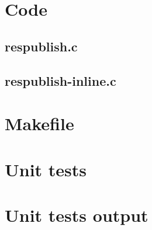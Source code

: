 \section{Code}

\subsection{respublish.c}

\begin{scriptsize}
\begin{ttfamily}

\end{ttfamily}
\end{scriptsize}

\subsection{respublish-inline.c}

\begin{scriptsize}
\begin{ttfamily}

\end{ttfamily}
\end{scriptsize}

\section{Makefile}

\begin{scriptsize}
\begin{ttfamily}

\end{ttfamily}
\end{scriptsize}

\section{Unit tests}

\begin{scriptsize}
\begin{ttfamily}

\end{ttfamily}
\end{scriptsize}

\section{Unit tests output}

\begin{scriptsize}
\begin{ttfamily}

\end{ttfamily}
\end{scriptsize}

